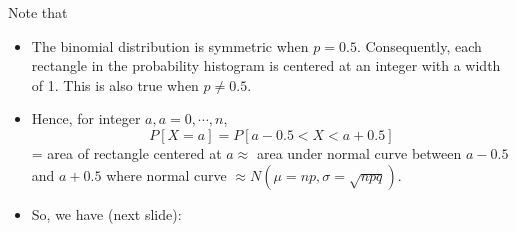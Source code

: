 \documentclass[14pt]{beamer}\usepackage[]{graphicx}\usepackage[]{color}
\begin{document}
\begin{frame}[fragile]{Note that}

\begin{itemize}
\item The binomial distribution is symmetric when $p = 0.5$.
Consequently, each rectangle in the probability histogram is centered at an integer with a width of 1. This is also true when $p \ne 0.5$.

\item Hence, for integer $a, a = 0, \cdots , n$, 
$$P[X = a] = P[a - 0.5 < X < a + 0.5]$$ = 
area of rectangle centered at $a \approx$ area under normal curve between $a - 0.5$  and $a + 0.5$ where normal curve
$ \approx N(\mu = np, \sigma = \sqrt{npq} )$. 

\item So, we have (next slide):
\end{itemize}
\end{frame}
\end{document}

